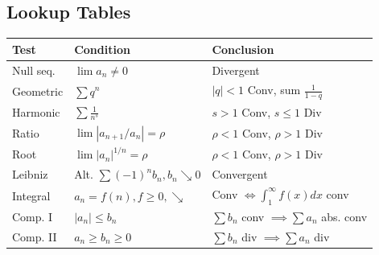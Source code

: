 \subsection{Lookup Tables}

\begin{center}
\scriptsize
\setlength{\tabcolsep}{2pt}
\begin{tabularx}{\columnwidth}{|l|X|X|}
\hline
\textbf{Test} & \textbf{Condition} & \textbf{Conclusion} \\ \hline
Null seq. & $\lim a_n \neq 0$ & Divergent \\ \hline
Geometric & $\sum q^n$ & $|q| < 1$ Conv, sum $\frac{1}{1-q}$ \\ \hline
Harmonic & $\sum \frac{1}{n^s}$ & $s > 1$ Conv, $s \le 1$ Div \\ \hline
Ratio & $\lim |a_{n+1}/a_n| = \rho$ & $\rho < 1$ Conv, $\rho > 1$ Div \\ \hline
Root & $\lim |a_n|^{1/n} = \rho$ & $\rho < 1$ Conv, $\rho > 1$ Div \\ \hline
Leibniz & Alt. $\sum (-1)^n b_n, b_n \searrow 0$ & Convergent \\ \hline
Integral & $a_n = f(n), f \ge 0, \searrow$ & Conv $\iff \int_1^\infty f(x)dx$ conv \\ \hline
Comp. I & $|a_n| \le b_n$ & $\sum b_n$ conv $\implies \sum a_n$ abs. conv \\ \hline
Comp. II & $a_n \ge b_n \ge 0$ & $\sum b_n$ div $\implies \sum a_n$ div \\ \hline
\end{tabularx}
\end{center}

